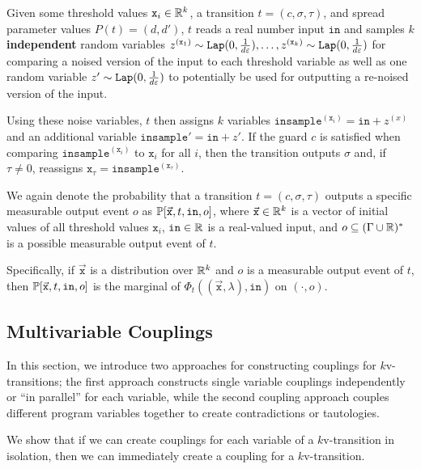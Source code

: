Given some threshold values $\texttt{x}_i\in \mathbb{R}^k$, a transition $t = (c, \sigma, \tau)$, and spread parameter values $P(t) = (d, d')$, $t$ reads a real number input $\texttt{in}$ and 
samples $k$ \textbf{independent} random variables $z^{(\texttt{x}_1)}\sim\texttt{Lap}(0, \frac{1}{d\varepsilon}),\ldots, z^{(\texttt{x}_k)}\sim\texttt{Lap}(0, \frac{1}{d\varepsilon})$ for comparing a noised version of the input to each threshold variable as well as one random variable $z' \sim\texttt{Lap}(0, \frac{1}{d\varepsilon})$ to potentially be used for outputting a re-noised version of the input. 

Using these noise variables, $t$ then assigns $k$ variables $\texttt{insample}^{(\texttt{x}_i)} = \texttt{in} + z^{(x)}$ and an additional variable $\texttt{insample}' = \texttt{in} + z'$. 
If the guard $c$ is satisfied when comparing $\texttt{insample}^{(\texttt{x}_i)}$ to $\texttt{x}_i$ for all $i$, then the transition outputs $\sigma$ and, if $\tau\neq 0$, reassigns $\texttt{x}_{\tau} = \texttt{insample}^{(\texttt{x}_\tau)}$.

We again denote the probability that a transition $t=(c, \sigma, \tau)$ outputs a specific measurable output event $o$ as $\mathbb{P}[\vec{\texttt{x}}, t, \texttt{in}, o]$, where $\vec{\texttt{x}}\in \mathbb{R}^k$ is a vector of initial values of all threshold values $\texttt{x}_i$, $\texttt{in}\in \mathbb{R}$ is a real-valued input, and $o\subseteq (\Gamma\cup\mathbb{R})^*$  is a possible measurable output event of $t$.

Specifically, if $\vec{\texttt{x}}$ is a distribution over $\mathbb{R}^k$ and $o$ is a measurable output event of $t$, then $\mathbb{P}[\vec{\texttt{x}}, t, \texttt{in}, o]$ is the marginal of $\Phi_t((\vec{\texttt{x}}, \lambda), \texttt{in})$ on $(\cdot, o)$.

\subsection{Multivariable Couplings}

In this section, we introduce two approaches for constructing couplings for $k$v-transitions; the first approach constructs single variable couplings independently or ``in parallel'' for each variable, while the second coupling approach couples different program variables together to create contradictions or tautologies. 

We show that if we can create couplings for each variable of a $k$v-transition in isolation, then we can immediately create a coupling for a $k$v-transition. 

